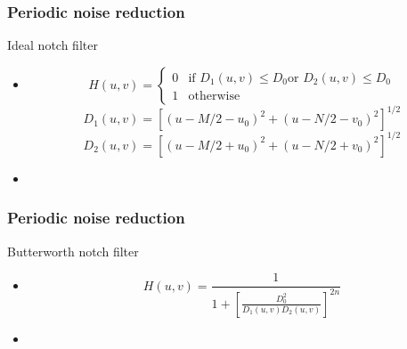 \documentclass{beamer}
\begin{document}
\begin{frame}
\frametitle{Periodic noise reduction}
\begin{block}{Ideal notch filter}
\begin{itemize}
\item[]
\[
 	H(u,v) = 
  	\begin{cases} 
   	0 & \text{if } D_{1}(u,v) \leq D_{0} \text{or } D_{2}(u,v) \leq D_{0}   \\
   	1 & \text{otherwise }
  	\end{cases}
	\]
	$$D_{1}(u,v) = \left[ (u-M/2-u_{0})^2 + (u-N/2-v_{0})^2 \right]^{1/2}$$
	$$D_{2}(u,v) = \left[ (u-M/2+u_{0})^2 + (u-N/2+v_{0})^2\right]^{1/2}$$
\item[]
\end{itemize}
\end{block}
\end{frame}
\begin{frame}
\frametitle{Periodic noise reduction}
\begin{block}{Butterworth notch filter}
\begin{itemize}
\item[]
	\[
 	H(u,v) = \frac{1}{1+\left[ \frac{D_{0}^2}{D_{1}(u,v)D_{2}(u,v)}\right]^{2n}}
  	\]
\item[]
\end{itemize}
\end{block}
\end{frame}
\end{document}
